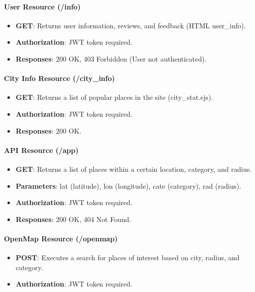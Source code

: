 \documentclass[../main.tex]{subfiles}
\begin{document}
\paragraph{User Resource (/info)}

\begin{itemize}
  \item \textbf{GET}: Returns user information, reviews, and feedback (HTML user\_info).
  \item \textbf{Authorization}: JWT token required.
  \item \textbf{Responses}: 200 OK, 403 Forbidden (User not authenticated).
\end{itemize}

\paragraph{City Info Resource (/city\_info)}

\begin{itemize}
  \item \textbf{GET}: Returns a list of popular places in the site (city\_stat.ejs).
  \item \textbf{Authorization}: JWT token required.
  \item \textbf{Responses}: 200 OK.
\end{itemize}

\paragraph{API Resource (/app)}

\begin{itemize}
  \item \textbf{GET}: Returns a list of places within a certain location, category, and radius.
  \item \textbf{Parameters}: lat (latitude), lon (longitude), cate (category), rad (radius).
  \item \textbf{Authorization}: JWT token required.
  \item \textbf{Responses}: 200 OK, 404 Not Found.
\end{itemize}

\paragraph{OpenMap Resource (/openmap)}

\begin{itemize}
  \item \textbf{POST}: Executes a search for places of interest based on city, radius, and category.
  \item \textbf{Authorization}: JWT token required.
\end{itemize}
\end{document}
